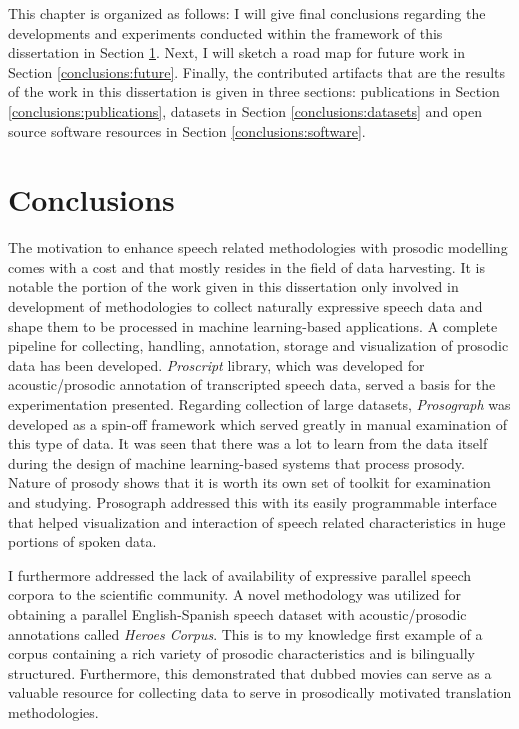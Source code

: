 This chapter is organized as follows: I will give final conclusions regarding the developments and experiments conducted within the framework of this dissertation in Section \ref{conclusions:conclusions}. Next, I will sketch a road map for future work in Section \ref{conclusions:future}. Finally, the contributed artifacts that are the results of the work in this dissertation is given in three sections: publications in Section \ref{conclusions:publications}, datasets in Section \ref{conclusions:datasets} and open source software resources in Section \ref{conclusions:software}.

\section{Conclusions}
\label{conclusions:conclusions}

The motivation to enhance speech related methodologies with prosodic modelling comes with a cost and that mostly resides in the field of data harvesting. It is notable the portion of the work given in this dissertation only involved in development of methodologies to collect naturally expressive speech data and shape them to be processed in machine learning-based applications. A complete pipeline for collecting, handling, annotation, storage and visualization of prosodic data has been developed. \textit{Proscript} library, which was developed for acoustic/prosodic annotation of transcripted speech data, served a basis for the experimentation presented. Regarding collection of large datasets, \textit{Prosograph} was developed as a spin-off framework which served greatly in manual examination of this type of data. It was seen that there was a lot to learn from the data itself during the design of machine learning-based systems that process prosody. Nature of prosody shows that it is worth its own set of toolkit for examination and studying. Prosograph addressed this with its easily programmable interface that helped visualization and interaction of speech related characteristics in huge portions of spoken data. 

I furthermore addressed the lack of availability of expressive parallel speech corpora to the scientific community. A novel methodology was utilized for obtaining a parallel English-Spanish speech dataset with acoustic/prosodic annotations called \textit{Heroes Corpus}. This is to my knowledge first example of a corpus containing a rich variety of prosodic characteristics and is bilingually structured. Furthermore, this demonstrated that dubbed movies can serve as a valuable resource for collecting data to serve in prosodically motivated translation methodologies. 

